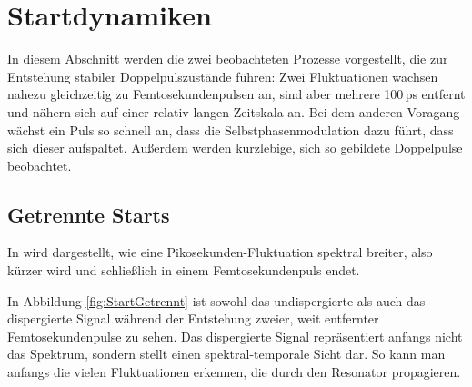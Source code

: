 \documentclass[bachelor,       %
               twoside,        %
               BCOR10mm,       %
               liststotoc,nomtotoc,bibtotoc, %
               english,ngerman, %
               final,          %
               ]{GAUBM}
\begin{document}
\clearpage

\section{Startdynamiken}
\label{sec:start}
In diesem Abschnitt werden die zwei beobachteten Prozesse vorgestellt, die zur Entstehung stabiler Doppelpulszustände führen:
Zwei Fluktuationen wachsen nahezu gleichzeitig zu Femtosekundenpulsen an, sind aber mehrere 100\,ps entfernt und nähern sich auf einer relativ langen Zeitskala an.
Bei dem anderen Voragang wächst ein Puls so schnell an, dass die Selbstphasenmodulation dazu führt, dass sich dieser aufspaltet.
Außerdem werden kurzlebige, sich so gebildete Doppelpulse beobachtet.

\subsection{Getrennte Starts}
In \cite{herink_resolving_2016} wird dargestellt, wie eine Pikosekunden-Fluktuation  spektral breiter, also kürzer wird und schließlich in einem Femtosekundenpuls endet.

In Abbildung \ref{fig:StartGetrennt} ist sowohl das undispergierte als auch das dispergierte Signal während der Entstehung zweier, weit entfernter Femtosekundenpulse zu sehen.
Das dispergierte Signal repräsentiert anfangs nicht das Spektrum, sondern stellt einen spektral-temporale Sicht dar.
So kann man anfangs die vielen Fluktuationen erkennen, die durch den Resonator propagieren.
\end{document}
